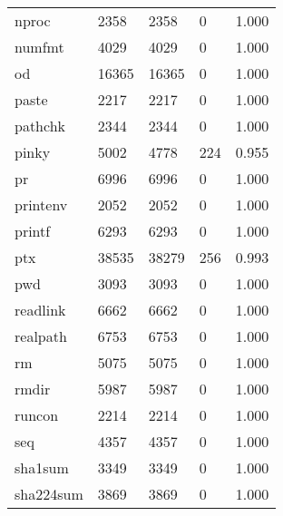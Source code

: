 \begin{longtable}{lp{4.5cm}p{4.5cm}p{4.5cm}p{4.5cm}}
nproc     &                     2358 &         2358 &             0 &                    1.000 \\
numfmt    &                     4029 &         4029 &             0 &                    1.000 \\
od        &                    16365 &        16365 &             0 &                    1.000 \\
paste     &                     2217 &         2217 &             0 &                    1.000 \\
pathchk   &                     2344 &         2344 &             0 &                    1.000 \\
pinky     &                     5002 &         4778 &           224 &                    0.955 \\
pr        &                     6996 &         6996 &             0 &                    1.000 \\
printenv  &                     2052 &         2052 &             0 &                    1.000 \\
printf    &                     6293 &         6293 &             0 &                    1.000 \\
ptx       &                    38535 &        38279 &           256 &                    0.993 \\
pwd       &                     3093 &         3093 &             0 &                    1.000 \\
readlink  &                     6662 &         6662 &             0 &                    1.000 \\
realpath  &                     6753 &         6753 &             0 &                    1.000 \\
rm        &                     5075 &         5075 &             0 &                    1.000 \\
rmdir     &                     5987 &         5987 &             0 &                    1.000 \\
runcon    &                     2214 &         2214 &             0 &                    1.000 \\
seq       &                     4357 &         4357 &             0 &                    1.000 \\
sha1sum   &                     3349 &         3349 &             0 &                    1.000 \\
sha224sum &                     3869 &         3869 &             0 &                    1.000 \\

\end{longtable}
